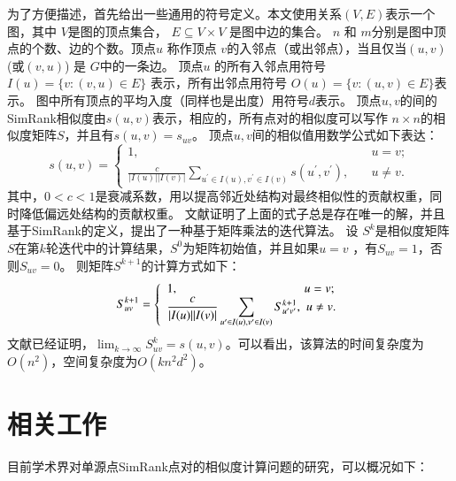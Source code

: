 \documentclass[master]{njuthesis}
\begin{document}
为了方便描述，首先给出一些通用的符号定义。本文使用关系$(V, E)$表示一个图，其中 $V$是图的顶点集合，
$E \subseteq V \times V$ 是图中边的集合。
$n$ 和 $m$分别是图中顶点的个数、边的个数。顶点$u$ 称作顶点 $v$的入邻点（或出邻点），当且仅当$(u, v)$(或$(v,u)$) 是 $G$中的一条边。
顶点$u$ 的所有入邻点用符号 $I(u)=\{v: (v, u) \in E\}$ 表示，所有出邻点用符号 $O(u)=\{v: (u, v) \in E\}$表示。
图中所有顶点的平均入度（同样也是出度）用符号$d$表示。
顶点$u, v$的间的SimRank相似度由$s(u, v)$表示，相应的，所有点对的相似度可以写作 $n\times n$的相似度矩阵$S$，并且有$s(u, v)=s_{uv}$。
顶点$u, v$间的相似值用数学公式如下表达：
\begin{equation}
s(u, v) = \left\{
        \begin{array}{ll}
	1, & \quad u = v ; \\
	\displaystyle\frac{c}{|I(u)||I(v)|}\displaystyle\sum_{u^\prime \in I(u), v^\prime \in I(v)} s(u^\prime, v^\prime), & \quad u \ne v.
        \end{array}
    \right.
	\label{eq:one}
\end{equation}
其中，$0 < c < 1$是衰减系数，用以提高邻近处结构对最终相似性的贡献权重，同时降低偏远处结构的贡献权重。
文献\cite{jeh2002simrank}证明了上面的式子总是存在唯一的解，并且基于SimRank的定义，提出了一种基于矩阵乘法的迭代算法。
设 $S^k$是相似度矩阵$S$在第$k$轮迭代中的计算结果，$S^0$为矩阵初始值，并且如果$u = v$ ，有$S_{uv} = 1$，否则$S_{uv} = 0$。
则矩阵$S^{k+1}$的计算方式如下：
\begin{equation}
S^{k+1}_{uv} = \left\{
        \begin{array}{ll}
	1, &\hspace{-0.5em}  \! u = v ; \\
	\displaystyle\frac{c}{|I(u)||I(v)|}\displaystyle\sum_{u^\prime \in I(u), v^\prime \in I(v)} S^{k+1}_{u^\prime v^\prime} , & \hspace{-0.5em} u \ne v.
        \end{array}
    \right.
	\label{eq:two}
\end{equation}
文献\cite{jeh2002simrank}已经证明，$\lim_{k\to\infty}S^k_{uv} = s(u,v)$。可以看出，该算法的时间复杂度为$O(n^2)$，空间复杂度为$O(kn^2d^2)$。

\section{相关工作}
目前学术界对单源点SimRank点对的相似度计算问题的研究，可以概况如下：
\end{document}
